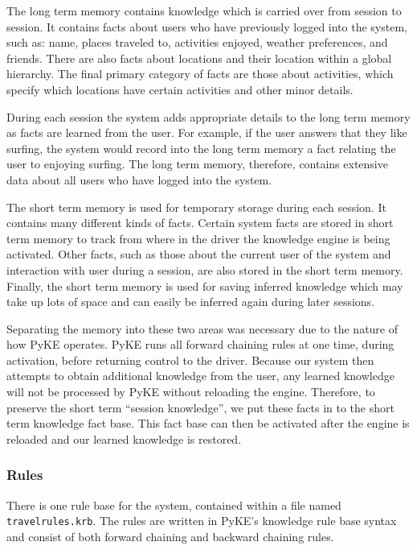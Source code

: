 \documentclass[11pt]{article} %
\begin{document}
The long term memory contains knowledge which is carried over from session to session. It contains facts about users who have previously logged into the system, such as: name, places traveled to, activities enjoyed, weather preferences, and friends. There are also facts about locations and their location within a global hierarchy. The final primary category of facts are those about activities, which specify which locations have certain activities and other minor details.

During each session the system adds appropriate details to the long term memory as facts are learned from the user. For example, if the user answers that they like surfing, the system would record into the long term memory a fact relating the user to enjoying surfing. The long term memory, therefore, contains extensive data about all users who have logged into the system.

The short term memory is used for temporary storage during each session. It contains many different kinds of facts. Certain system facts are stored in short term memory to track from where in the driver the knowledge engine is being activated. Other facts, such as those about the current user of the system and interaction with user during a session, are also stored in the short term memory. Finally, the short term memory is used for saving inferred knowledge which may take up lots of space and can easily be inferred again during later sessions.

Separating the memory into these two areas was necessary due to the nature of how PyKE operates. PyKE runs all forward chaining rules at one time, during activation, before returning control to the driver. Because our system then attempts to obtain additional knowledge from the user, any learned knowledge will not be processed by PyKE without reloading the engine. Therefore, to preserve the short term ``session knowledge'', we put these facts in to the short term knowledge fact base. This fact base can then be activated after the engine is reloaded and our learned knowledge is restored.

\subsubsection{Rules}

There is one rule base for the system, contained within a file named \texttt{travelrules.krb}. The rules are written in PyKE's knowledge rule base syntax and consist of both forward chaining and backward chaining rules.
\end{document}
